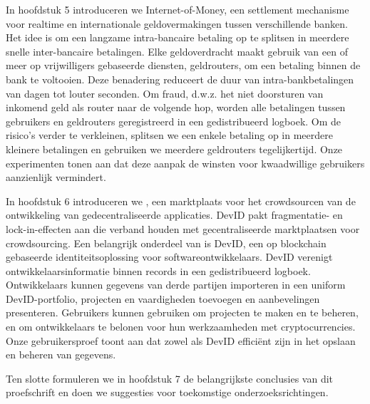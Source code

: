 {In hoofdstuk 5 introduceren we Internet-of-Money, een settlement mechanisme voor realtime en internationale geldovermakingen tussen verschillende banken.
Het idee is om een ​​langzame intra-bancaire betaling op te splitsen in meerdere snelle inter-bancaire betalingen.
Elke geldoverdracht maakt gebruik van een of meer op vrijwilligers gebaseerde diensten, geldrouters, om een ​​betaling binnen de bank te voltooien.
Deze benadering reduceert de duur van intra-bankbetalingen van dagen tot louter seconden.
Om fraud, d.w.z. het niet doorsturen van inkomend geld als router naar de volgende hop, worden alle betalingen tussen gebruikers en geldrouters geregistreerd in een gedistribueerd logboek.
Om de risico's verder te verkleinen, splitsen we een enkele betaling op in meerdere kleinere betalingen en gebruiken we meerdere geldrouters tegelijkertijd.
Onze experimenten tonen aan dat deze aanpak de winsten voor kwaadwillige gebruikers aanzienlijk vermindert.

In hoofdstuk 6 introduceren we \Dappcoder{}, een marktplaats voor het crowdsourcen van de ontwikkeling van gedecentraliseerde applicaties.
DevID pakt fragmentatie- en lock-in-effecten aan die verband houden met gecentraliseerde marktplaatsen voor crowdsourcing.
Een belangrijk onderdeel van \Dappcoder{} is DevID, een op blockchain gebaseerde identiteitsoplossing voor softwareontwikkelaars.
DevID verenigt ontwikkelaarsinformatie binnen records in een gedistribueerd logboek.
Ontwikkelaars kunnen gegevens van derde partijen importeren in een uniform DevID-portfolio, projecten en vaardigheden toevoegen en aanbevelingen presenteren.
Gebruikers kunnen \Dappcoder{} gebruiken om projecten te maken en te beheren, en om ontwikkelaars te belonen voor hun werkzaamheden met cryptocurrencies.
Onze gebruikersproef toont aan dat zowel \Dappcoder{} als DevID efficiënt zijn in het opslaan en beheren van gegevens.

Ten slotte formuleren we in hoofdstuk 7 de belangrijkste conclusies van dit proefschrift en doen we suggesties voor toekomstige onderzoeksrichtingen.
}



